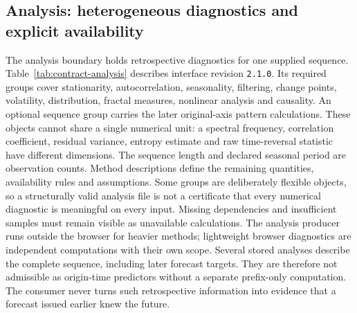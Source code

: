 \subsection{Analysis: heterogeneous diagnostics and explicit availability}
\label{sec:contract-analysis}
The analysis boundary holds retrospective diagnostics for one supplied sequence. Table~\ref{tab:contract-analysis} describes interface revision \texttt{2.1.0}. Its required groups cover stationarity, autocorrelation, seasonality, filtering, change points, volatility, distribution, fractal measures, nonlinear analysis and causality. An optional sequence group carries the later original-axis pattern calculations. These objects cannot share a single numerical unit: a spectral frequency, correlation coefficient, residual variance, entropy estimate and raw time-reversal statistic have different dimensions. The sequence length and declared seasonal period are observation counts. Method descriptions define the remaining quantities, availability rules and assumptions. Some groups are deliberately flexible objects, so a structurally valid analysis file is not a certificate that every numerical diagnostic is meaningful on every input. Missing dependencies and insufficient samples must remain visible as unavailable calculations. The analysis producer runs outside the browser for heavier methods; lightweight browser diagnostics are independent computations with their own scope. Several stored analyses describe the complete sequence, including later forecast targets. They are therefore not admissible as origin-time predictors without a separate prefix-only computation. The consumer never turns such retrospective information into evidence that a forecast issued earlier knew the future.


